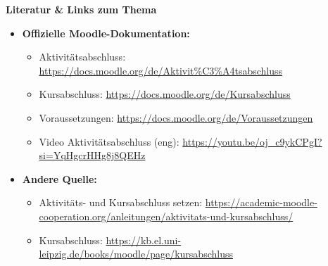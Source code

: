 \documentclass{article}
\newlength{\commonwidth}
\begin{document}
\begin{center}
\begin{minipage}{\commonwidth}
\begin{mdframed}[
    backgroundcolor=lightgray, 
    linewidth=0pt, 
    roundcorner=5pt,
    innerleftmargin=1em,
    innerrightmargin=1em,
    innertopmargin=0.7em,
    innerbottommargin=0.7em
]
\raggedright %
\textbf{\textcolor{customred}{Literatur \& Links zum Thema}}
\vspace{0.2cm}

\begin{itemize}
\item \textbf{Offizielle Moodle-Dokumentation:}
\vspace{0.2cm}
  \begin{itemize}
  \item Aktivitätsabschluss: \url{https://docs.moodle.org/de/Aktivit%C3%A4tsabschluss}
  \item Kursabschluss: \url{https://docs.moodle.org/de/Kursabschluss}
  \item Voraussetzungen: \url{https://docs.moodle.org/de/Voraussetzungen}
  \item Video Aktivitätsabschluss (eng): \url{https://youtu.be/oj_c9ykCPgI?si=YqHgcrHHg8j8QEHz}
  \end{itemize}
\vspace{0.5cm}

\item \textbf{Andere Quelle:}
\vspace{0.2cm}
  \begin{itemize}
  \item Aktivitäts- und Kursabschluss setzen: \url{https://academic-moodle-cooperation.org/anleitungen/aktivitats-und-kursabschluss/}
  \item Kursabschluss: \url{https://kb.el.uni-leipzig.de/books/moodle/page/kursabschluss}
  \end{itemize}
\end{itemize}
\end{mdframed}
\end{minipage}
\end{center}
\end{document}
